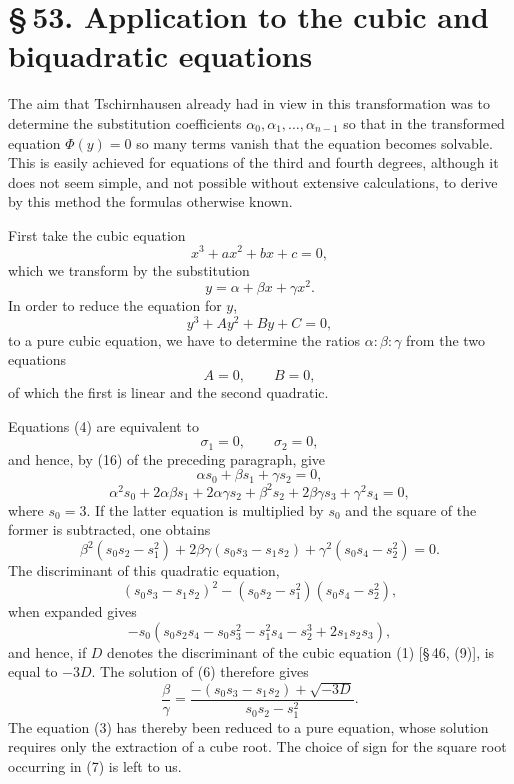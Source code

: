 \documentclass[11pt]{article}
\providecommand{\sect}[2]{\section*{\S\,#1. #2}}
\begin{document}
\sect{53}{Application to the cubic and biquadratic equations}

The aim that Tschirnhausen already had in view in this transformation was to determine the substitution coefficients $\alpha_0,\alpha_1,\ldots,\alpha_{n-1}$ so that in the transformed equation $\Phi(y)=0$ so many terms vanish that the equation becomes solvable. This is easily achieved for equations of the third and fourth degrees, although it does not seem simple, and not possible without extensive calculations, to derive by this method the formulas otherwise known.

First take the cubic equation
\begin{equation}
x^3+ax^2+bx+c=0,
\tag{1}
\end{equation}
which we transform by the substitution
\begin{equation}
y=\alpha+\beta x+\gamma x^2.
\tag{2}
\end{equation}
In order to reduce the equation for $y$,
\begin{equation}
y^3+Ay^2+By+C=0,
\tag{3}
\end{equation}
to a pure cubic equation, we have to determine the ratios $\alpha:\beta:\gamma$ from the two equations
\begin{equation}
A=0,
\qquad
B=0,
\tag{4}
\end{equation}
of which the first is linear and the second quadratic.

Equations (4) are equivalent to
\begin{equation}
\sigma_1=0,
\qquad
\sigma_2=0,
\tag{5}
\end{equation}
and hence, by (16) of the preceding paragraph, give
\[
\alpha s_0+\beta s_1+\gamma s_2=0,
\]
\[
\alpha^2s_0+2\alpha\beta s_1+2\alpha\gamma s_2+\beta^2s_2+2\beta\gamma s_3+\gamma^2s_4=0,
\]
where $s_0=3$. If the latter equation is multiplied by $s_0$ and the square of the former is subtracted, one obtains
\begin{equation}
\beta^2(s_0s_2-s_1^2)+2\beta\gamma(s_0s_3-s_1s_2)+\gamma^2(s_0s_4-s_2^2)=0.
\tag{6}
\end{equation}
The discriminant of this quadratic equation,
\[
(s_0s_3-s_1s_2)^2-(s_0s_2-s_1^2)(s_0s_4-s_2^2),
\]
when expanded gives
\[
-s_0(s_0s_2s_4-s_0s_3^2-s_1^2s_4-s_2^3+2s_1s_2s_3),
\]
and hence, if $D$ denotes the discriminant of the cubic equation (1) [\S\,46, (9)], is equal to $-3D$. The solution of (6) therefore gives
\begin{equation}
\frac{\beta}{\gamma}=\frac{-(s_0s_3-s_1s_2)+\sqrt{-3D}}{s_0s_2-s_1^2}.
\tag{7}
\end{equation}
The equation (3) has thereby been reduced to a pure equation, whose solution requires only the extraction of a cube root. The choice of sign for the square root occurring in (7) is left to us.
\end{document}

